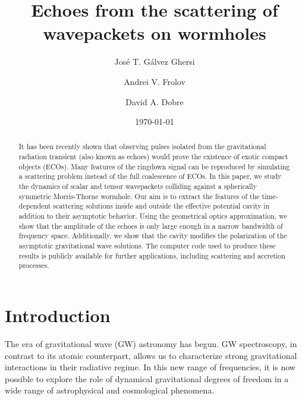 \documentclass[article,aps,nofootinbib,twocolumn,superscriptaddress]{revtex4-1}
\begin{document}
\title{Echoes from the scattering of wavepackets on wormholes}

\author{Jos\'e T. G\'alvez Ghersi}
\author{Andrei V. Frolov}
\author{David A. Dobre}
\date{\today}

\begin{abstract}
It has been recently shown that observing pulses isolated from the gravitational radiation transient (also known as echoes) would prove the existence of exotic compact objects (ECOs). Many features of the ringdown signal can be reproduced by simulating a scattering problem instead of the full coalescence of ECOs. In this paper, we study the dynamics of scalar and tensor wavepackets colliding against a spherically symmetric Morris-Thorne wormhole. Our aim is to extract the features of the time-dependent scattering solutions inside and outside the effective potential cavity in addition to their asymptotic behavior. Using the geometrical optics approximation, we show that the amplitude of the echoes is only large enough in a narrow bandwidth of frequency space. Additionally, we show that the cavity modifies the polarization of the asymptotic gravitational wave solutions. The computer code used to produce these results is publicly available for further applications, including scattering and accretion processes.      
\end{abstract}

\maketitle


\section{Introduction}
The era of gravitational wave (GW) astronomy \citep{Abbott:2016blz, Abbott:2016nmj} has begun. GW spectroscopy, in contrast to its atomic counterpart, allows us to characterize strong gravitational interactions in their radiative regime. In this new range of frequencies, it is now possible to explore the role of dynamical gravitational degrees of freedom in a wide range of astrophysical \citep{Frolov:2017asg, Cardoso:2016rao} and cosmological \citep{Krauss989, Ade:2018gkx} phenomena. 
\end{document}
